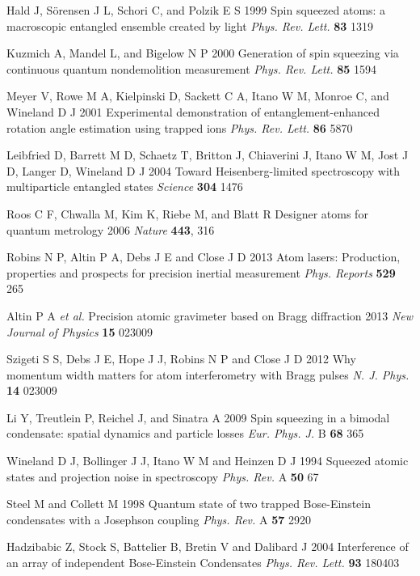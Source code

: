 \documentclass{iopart}
\begin{document}
\begin{thebibliography}{10}
 Hald J, S{\"{o}}rensen J L, Schori C, and Polzik E S 1999 Spin squeezed atoms: a macroscopic entangled ensemble created by light \emph{Phys. Rev. Lett.} {\bf 83} 1319

 Kuzmich A, Mandel L, and Bigelow N P 2000 Generation of spin squeezing via continuous quantum nondemolition measurement \emph{Phys. Rev. Lett.} {\bf 85} 1594 

 Meyer V, Rowe M A, Kielpinski D, Sackett C A, Itano W M, Monroe C, and Wineland D J 2001 Experimental demonstration of entanglement-enhanced rotation angle estimation using trapped ions \emph{Phys. Rev. Lett.} {\bf 86} 5870

 Leibfried D, Barrett M D, Schaetz T, Britton J, Chiaverini J, Itano W M, Jost J D, Langer D, Wineland D J 2004 Toward Heisenberg-limited spectroscopy with multiparticle entangled states \emph{Science} {\bf 304} 1476

 Roos C F, Chwalla M, Kim K, Riebe M, and Blatt R Designer atoms for
quantum metrology 2006 \emph{Nature} {\bf 443}, 316

 Robins N P, Altin P A, Debs J E and Close J D 2013 Atom lasers: Production, properties and prospects for precision inertial measurement \emph{Phys. Reports} {\bf 529} 265

 Altin P A \emph{et al.} Precision atomic gravimeter based on Bragg diffraction 2013 \emph{New Journal of Physics} {\bf 15} 023009

 Szigeti S S, Debs J E, Hope J J, Robins N P and Close J D 2012 Why momentum width matters for atom interferometry with Bragg pulses \emph{N. J. Phys.} {\bf 14} 023009

 Li Y, Treutlein P, Reichel J, and Sinatra A 2009 Spin squeezing in a bimodal condensate: spatial dynamics and particle losses \emph{Eur. Phys. J.} B {\bf 68} 365

 Wineland D J, Bollinger J J, Itano W M and Heinzen D J 1994 Squeezed atomic states and projection noise in spectroscopy \emph{Phys. Rev.} A {\bf 50} 67

 Steel M and Collett M 1998 Quantum state of two trapped Bose-Einstein condensates with a Josephson coupling \emph{Phys. Rev.} A {\bf 57} 2920

 Hadzibabic Z, Stock S, Battelier B, Bretin V and Dalibard J 2004 Interference of an array of independent Bose-Einstein Condensates \emph{Phys. Rev. Lett.} {\bf 93} 180403


\end{thebibliography}
\end{document}
